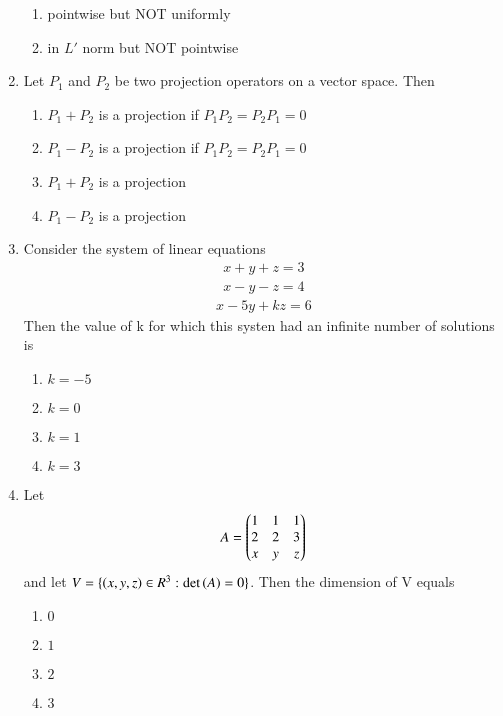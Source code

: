 \documentclass[journal,12pt,twocolumn]{IEEEtran}
\theoremstyle{remark}
\begin{document}
\begin{enumerate}
\begin{enumerate}
       \item pointwise but NOT uniformly
       \item in $L'$ norm but NOT pointwise 
\end{enumerate}
\item Let $P_1$ and $P_2$ be two projection operators on a vector space. Then 
\begin{enumerate}
    \item $P_1+P_2$ is a projection if $P_1P_2=P_2P_1=0$
    \item $P_1-P_2$ is a projection if $P_1P_2=P_2P_1=0$
    \item $P_1+P_2$ is a projection 
    \item $P_1-P_2$ is a projection 
\end{enumerate}
\item Consider the system of linear equations 
\begin{align*}
    x+y+z=3
\end{align*}
\begin{align*}
    x-y-z=4
\end{align*}
\begin{align*}
    x-5y+kz=6
\end{align*}
Then the value of k for which this systen had an infinite number of solutions is
\begin{multicols}{2}
    \begin{enumerate}
    \item $k=-5$
    \item $k=0$
    \item $k=1$
    \item $k=3$
\end{enumerate}
\end{multicols}
\item Let 
\begin{align*}
    A=\begin{pmatrix}1 & 1 & 1 \\ 2 &2 &3\\x& y & z \end{pmatrix}
\end{align*}
and let $V=\{\left(x,y,z\right)\in R^3:\text{det}\left(A\right)=0\}$. Then the dimension of V equals
\begin{multicols}{2}
\begin{enumerate}
    \item $0$
    \item $1$
    \item $2$
    \item $3$
\end{enumerate}    
\end{multicols}

\end{enumerate}
\end{document}
